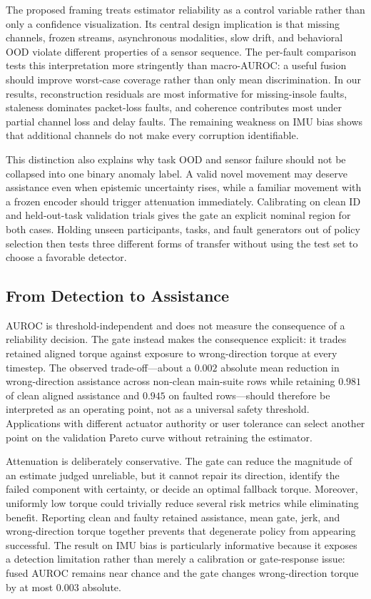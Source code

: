 \documentclass[letterpaper]{article} %
\begin{document}
The proposed framing treats estimator reliability as a control variable rather than only a confidence visualization.
Its central design implication is that missing channels, frozen streams, asynchronous modalities, slow drift, and behavioral OOD violate different properties of a sensor sequence.
The per-fault comparison tests this interpretation more stringently than macro-AUROC: a useful fusion should improve worst-case coverage rather than only mean discrimination.
In our results, reconstruction residuals are most informative for missing-insole faults, staleness dominates packet-loss faults, and coherence contributes most under partial channel loss and delay faults.
The remaining weakness on IMU bias shows that additional channels do not make every corruption identifiable.

This distinction also explains why task OOD and sensor failure should not be collapsed into one binary anomaly label.
A valid novel movement may deserve assistance even when epistemic uncertainty rises, while a familiar movement with a frozen encoder should trigger attenuation immediately.
Calibrating on clean ID and held-out-task validation trials gives the gate an explicit nominal region for both cases.
Holding unseen participants, tasks, and fault generators out of policy selection then tests three different forms of transfer without using the test set to choose a favorable detector.

\subsection{From Detection to Assistance}

AUROC is threshold-independent and does not measure the consequence of a reliability decision.
The gate instead makes the consequence explicit: it trades retained aligned torque against exposure to wrong-direction torque at every timestep.
The observed trade-off---about a $0.002$ absolute mean reduction in wrong-direction assistance across non-clean main-suite rows while retaining $0.981$ of clean aligned assistance and $0.945$ on faulted rows---should therefore be interpreted as an operating point, not as a universal safety threshold.
Applications with different actuator authority or user tolerance can select another point on the validation Pareto curve without retraining the estimator.

Attenuation is deliberately conservative.
The gate can reduce the magnitude of an estimate judged unreliable, but it cannot repair its direction, identify the failed component with certainty, or decide an optimal fallback torque.
Moreover, uniformly low torque could trivially reduce several risk metrics while eliminating benefit.
Reporting clean and faulty retained assistance, mean gate, jerk, and wrong-direction torque together prevents that degenerate policy from appearing successful.
The result on IMU bias is particularly informative because it exposes a detection limitation rather than merely a calibration or gate-response issue: fused AUROC remains near chance and the gate changes wrong-direction torque by at most $0.003$ absolute.
\end{document}
